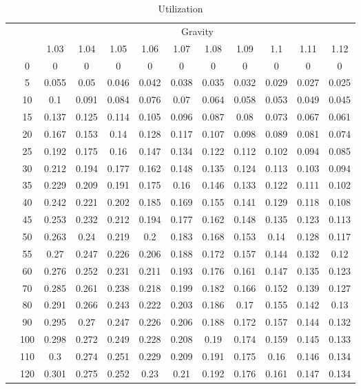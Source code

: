 \documentclass{article}
\begin{document}
\begin{table}[!h]
\centering
\begin{tabular}{cc|c|ccccccccc}
	& & \multicolumn{10}{c}{Gravity}\\
	& & 1.03 & 1.04 & 1.05 & 1.06 & 1.07 & 1.08 & 1.09 & 1.1 & 1.11 & 1.12\\ \hline
	\multirow{19}{*}{\rotatebox[origin=c]{90}{Time (minutes)}} & 0 & 0 & 0 & 0 & 0 & 0 & 0 & 0 & 0 & 0 & 0\\
	& 5 & 0.055 & 0.05 & 0.046 & 0.042 & 0.038 & 0.035 & 0.032 & 0.029 & 0.027 & 0.025\\
	& 10 & 0.1 & 0.091 & 0.084 & 0.076 & 0.07 & 0.064 & 0.058 & 0.053 & 0.049 & 0.045\\
	& 15 & 0.137 & 0.125 & 0.114 & 0.105 & 0.096 & 0.087 & 0.08 & 0.073 & 0.067 & 0.061\\
	& 20 & 0.167 & 0.153 & 0.14 & 0.128 & 0.117 & 0.107 & 0.098 & 0.089 & 0.081 & 0.074\\
	& 25 & 0.192 & 0.175 & 0.16 & 0.147 & 0.134 & 0.122 & 0.112 & 0.102 & 0.094 & 0.085\\
	& 30 & 0.212 & 0.194 & 0.177 & 0.162 & 0.148 & 0.135 & 0.124 & 0.113 & 0.103 & 0.094\\
	& 35 & 0.229 & 0.209 & 0.191 & 0.175 & 0.16 & 0.146 & 0.133 & 0.122 & 0.111 & 0.102\\
	& 40 & 0.242 & 0.221 & 0.202 & 0.185 & 0.169 & 0.155 & 0.141 & 0.129 & 0.118 & 0.108\\
	& 45 & 0.253 & 0.232 & 0.212 & 0.194 & 0.177 & 0.162 & 0.148 & 0.135 & 0.123 & 0.113\\
	& 50 & 0.263 & 0.24 & 0.219 & 0.2 & 0.183 & 0.168 & 0.153 & 0.14 & 0.128 & 0.117\\
	& 55 & 0.27 & 0.247 & 0.226 & 0.206 & 0.188 & 0.172 & 0.157 & 0.144 & 0.132 & 0.12\\
	& 60 & 0.276 & 0.252 & 0.231 & 0.211 & 0.193 & 0.176 & 0.161 & 0.147 & 0.135 & 0.123\\
	& 70 & 0.285 & 0.261 & 0.238 & 0.218 & 0.199 & 0.182 & 0.166 & 0.152 & 0.139 & 0.127\\
	& 80 & 0.291 & 0.266 & 0.243 & 0.222 & 0.203 & 0.186 & 0.17 & 0.155 & 0.142 & 0.13\\
	& 90 & 0.295 & 0.27 & 0.247 & 0.226 & 0.206 & 0.188 & 0.172 & 0.157 & 0.144 & 0.132\\
	& 100 & 0.298 & 0.272 & 0.249 & 0.228 & 0.208 & 0.19 & 0.174 & 0.159 & 0.145 & 0.133\\
	& 110 & 0.3 & 0.274 & 0.251 & 0.229 & 0.209 & 0.191 & 0.175 & 0.16 & 0.146 & 0.134\\
	& 120 & 0.301 & 0.275 & 0.252 & 0.23 & 0.21 & 0.192 & 0.176 & 0.161 & 0.147 & 0.134\\
	\hline\hline
\end{tabular}
\caption{Utilization}
\end{table}
\end{document}
